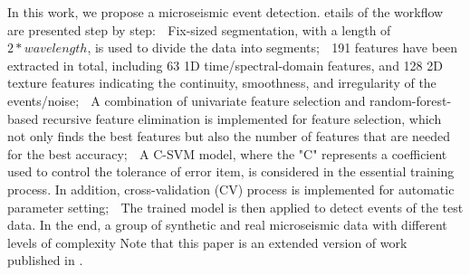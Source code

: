 In this work, we propose a microseismic event detection. etails of the workflow are presented step by step: \textcircled{\raisebox{-0.9pt}{1}} Fix-sized segmentation, with a length of $2*wavelength$, is used to divide the data into segments; \textcircled{\raisebox{-0.9pt}{2}} 191 features have been extracted in total, including 63 1D time/spectral-domain features, and 128 2D texture features indicating the continuity, smoothness, and irregularity of the events/noise; \textcircled{\raisebox{-0.9pt}{3}} A combination of univariate feature selection and random-forest-based recursive feature elimination is implemented for feature selection, which not only finds the best features but also the number of features that are needed for the best accuracy; \textcircled{\raisebox{-0.9pt}{4}} A C-SVM model, where the "C" represents a coefficient used to control the tolerance of error item, is considered in the essential training process. In addition, cross-validation (CV) process is implemented for  automatic parameter setting; \textcircled{\raisebox{-0.9pt}{5}} The trained model is then applied to detect events of the test data. In the end, a group of synthetic and real microseismic data with different levels of complexity  Note that this paper is an extended version of work published in \cite{qu2018automatic}.

